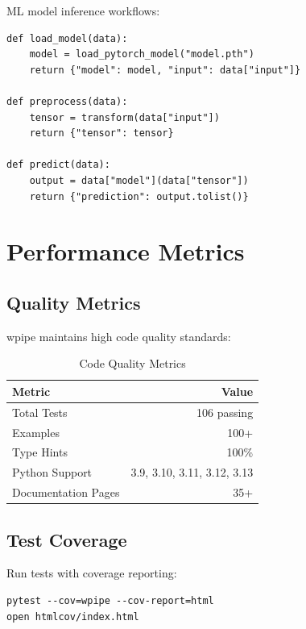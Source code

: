 \documentclass[12pt,a4paper]{report}
\begin{document}
ML model inference workflows:

\begin{lstlisting}[caption={ML Pipeline}, label={lst:ml-pipeline}]
def load_model(data):
    model = load_pytorch_model("model.pth")
    return {"model": model, "input": data["input"]}

def preprocess(data):
    tensor = transform(data["input"])
    return {"tensor": tensor}

def predict(data):
    output = data["model"](data["tensor"])
    return {"prediction": output.tolist()}
\end{lstlisting}

\chapter{Performance Metrics}
\cleardoublepage

\section{Quality Metrics}

wpipe maintains high code quality standards:

\begin{table}[H]
    \centering
    \caption{Code Quality Metrics}
    \label{tab:metrics}
    \begin{tabular}{lr}
        \toprule
        \textbf{Metric} & \textbf{Value} \\
        \midrule
        Total Tests & 106 passing \\
        Examples & 100+ \\
        Type Hints & 100\% \\
        Python Support & 3.9, 3.10, 3.11, 3.12, 3.13 \\
        Documentation Pages & 35+ \\
        \bottomrule
    \end{tabular}
\end{table}

\section{Test Coverage}

Run tests with coverage reporting:

\begin{lstlisting}[caption={Test Coverage}, label={lst:coverage}]
pytest --cov=wpipe --cov-report=html
open htmlcov/index.html
\end{lstlisting}
\end{document}
